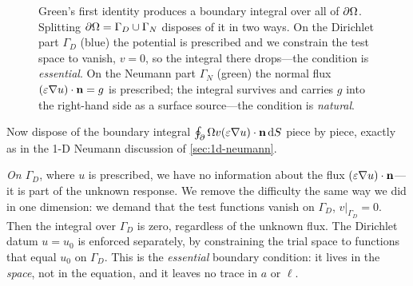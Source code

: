 \begin{figure}[t]
\centering
{}
\caption[The boundary splits into Dirichlet and Neumann parts]{Green's first
identity produces a boundary integral over all of $\partial\Omega$. Splitting
$\partial\Omega=\Gamma_D\cup\Gamma_N$ disposes of it in two ways. On the Dirichlet part
$\Gamma_D$ (blue) the potential is prescribed and we constrain the test space to
vanish, $v=0$, so the integral there drops---the condition is \emph{essential}.
On the Neumann part $\Gamma_N$ (green) the normal flux $(\varepsilon\nabla
u)\cdot\mathbf{n}=g$ is prescribed; the integral survives and carries $g$ into the
right-hand side as a surface source---the condition is \emph{natural}.}
\label{fig:greenbdry}
\end{figure}

Now dispose of the boundary integral $\oint_\partial\Omega v(\varepsilon\nabla
u)\cdot\mathbf{n}\,\mathrm{d}S$ piece by piece, exactly as in the 1-D Neumann
discussion of \cref{sec:1d-neumann}.

\emph{On $\Gamma_D$}, where $u$ is prescribed, we have no information about the
flux $(\varepsilon\nabla u)\cdot\mathbf{n}$---it is part of the unknown response. We
remove the difficulty the same way we did in one dimension: we demand that the
test functions vanish on $\Gamma_D$, $v|_{\Gamma_D}=0$. Then the integral over
$\Gamma_D$ is zero, regardless of the unknown flux. The Dirichlet datum $u=u_0$
is enforced separately, by constraining the trial space to functions that equal
$u_0$ on $\Gamma_D$. This is the \emph{essential} boundary condition: it lives in
the \emph{space}, not in the equation, and it leaves no trace in $a$ or $\ell$.

